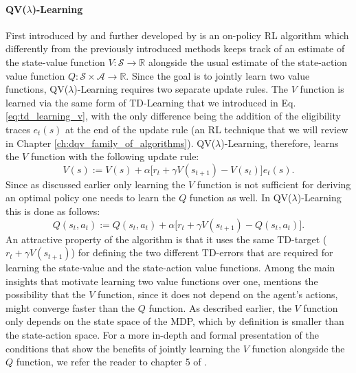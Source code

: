\paragraph{\textbf{\uppercase{QV}($\lambda$)-\uppercase{L}earning}} First introduced by \citet{wiering2005qv} and further developed by \citet{wiering2009qv} is an on-policy RL algorithm which differently from the previously introduced methods keeps track of an estimate of the state-value function $V:\mathcal{S}\rightarrow\mathbb{R}$ alongside the usual estimate of the state-action value function $Q:\mathcal{S}\times\mathcal{A}\rightarrow\mathbb{R}$. Since the goal is to jointly learn two value functions, QV($\lambda$)-Learning requires two separate update rules. The $V$ function is learned via the same form of TD-Learning that we introduced in Eq. \ref{eq:td_learning_v}, with the only difference being the addition of the eligibility traces $e_t(s)$ at the end of the update rule (an RL technique that we will review in Chapter \ref{ch:dqv_family_of_algorithms}). QV($\lambda$)-Learning, therefore, learns the $V$ function with the following update rule:
\begin{equation}
V(s):= V(s) + \alpha \big[ r_{t} + \gamma V(s_{t+1}) - V(s_t) \big] e_{t}(s).
\label{eqch02:qv_lambda_v_update}
\end{equation}
Since as discussed earlier only learning the $V$ function is not sufficient for deriving an optimal policy one needs to learn the $Q$ function as well. In QV($\lambda$)-Learning this is done as follows:
\begin{equation}
Q(s_{t}, a_{t}):= Q(s_{t}, a_{t}) + \alpha \big[r_{t} + \gamma V(s_{t+1}) - Q(s_{t}, a_{t}) \big].
\label{eqch02:qv_lambda_q_update}
\end{equation}
An attractive property of the algorithm is that it uses the same TD-target ($r_t + \gamma V(s_{t+1})$) for defining the two different TD-errors that are required for learning the state-value and the state-action value functions. Among the main insights that motivate learning two value functions over one, \citet{wiering2005qv} mentions the possibility that the $V$ function, since it does not depend on the agent's actions, might converge faster than the $Q$ function. As described earlier, the $V$ function only depends on the state space of the MDP, which by definition is smaller than the state-action space. For a more in-depth and formal presentation of the conditions that show the benefits of jointly learning the $V$ function alongside the $Q$ function, we refer the reader to chapter 5 of \cite{van2011insights}.


